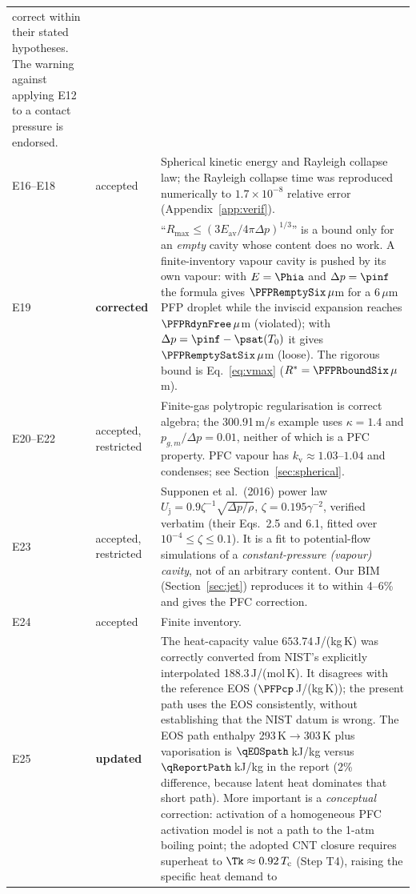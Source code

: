 \begin{center}
\begin{longtable}{p{}p{}p{}}
correct within their stated hypotheses. The warning against applying E12 to a contact pressure is
endorsed.\\
E16--E18 & accepted & Spherical kinetic energy and Rayleigh collapse law; the Rayleigh collapse time was
reproduced numerically to $1.7\times10^{-8}$ relative error (Appendix~\ref{app:verif}).\\
E19 & \textbf{corrected} & ``$R_{\max}\le(3E_{\mathrm{av}}/4\pi\Delta p)^{1/3}$'' is a bound only for an
\emph{empty} cavity whose content does no work. A finite-inventory vapour cavity is pushed by its own vapour: with $E=\Phia$ and
$\Delta p=\pinf$ the formula gives $\PFPRemptySix\,\mu$m for a 6\,$\mu$m PFP droplet while the inviscid expansion reaches
$\PFPRdynFree\,\mu$m (violated); with $\Delta p=\pinf-\psat(T_0)$ it gives $\PFPRemptySatSix\,\mu$m (loose). The rigorous
bound is Eq.~\eqref{eq:vmax} ($R^*=\PFPRboundSix\,\mu$m).\\
E20--E22 & accepted, restricted & Finite-gas polytropic regularisation is correct algebra; the 300.91\,m/s
example uses $\kappa=1.4$ and $p_{g,m}/\Delta p=0.01$, neither of which is a PFC property. PFC vapour
has $k_{\mathrm v}\approx1.03$--$1.04$ and condenses; see Section~\ref{sec:spherical}.\\
E23 & accepted, restricted & Supponen et al.\ (2016) power law $U_{\mathrm j}=0.9\zeta^{-1}\sqrt{\Delta p/\rho}$,
$\zeta=0.195\gamma^{-2}$, verified verbatim (their Eqs.~2.5 and 6.1, fitted over $10^{-4}\le\zeta\le0.1$).
It is a fit to potential-flow simulations of a \emph{constant-pressure (vapour) cavity}, not of an
arbitrary content. Our BIM (Section~\ref{sec:jet}) reproduces it to within 4--6\% and gives the PFC
correction.\\
E24 & accepted & Finite inventory.\\
E25 & \textbf{updated} & The heat-capacity value $653.74$\,J/(kg\,K) was correctly converted from
NIST's explicitly interpolated 188.3\,J/(mol\,K). It disagrees with the reference EOS
($\PFPcp$\,J/(kg\,K)); the present path uses the EOS consistently, without establishing that the
NIST datum is wrong. The EOS path enthalpy 293\,K$\to$303\,K plus
vaporisation is $\qEOSpath$\,kJ/kg versus $\qReportPath$\,kJ/kg in the report (2\% difference, because
latent heat dominates that short path). More important is a \emph{conceptual} correction: activation of
a homogeneous PFC activation model is not a path to the 1-atm boiling point; the adopted CNT closure requires
superheat to $\Tk\approx0.92\,T_{\mathrm c}$ (Step T4), raising the specific heat demand to

\end{longtable}
\end{center}

